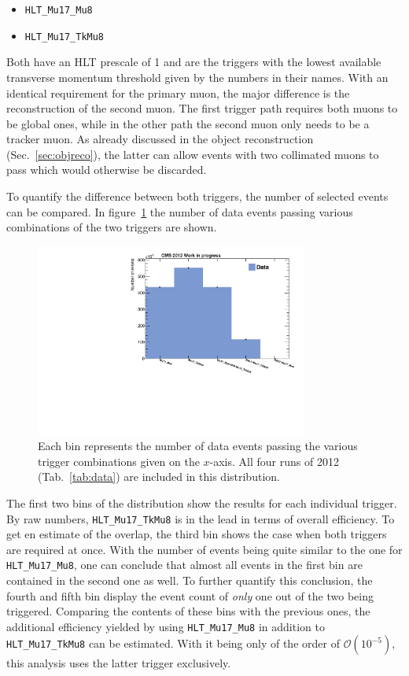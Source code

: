 \begin{itemize}
\item \verb+HLT_Mu17_Mu8+
\item \verb+HLT_Mu17_TkMu8+
\end{itemize}

Both have an HLT prescale of 1 and are the triggers with the lowest available transverse momentum threshold given by the numbers in their names. With an identical requirement for the primary muon, the major difference is the reconstruction of the second muon. The first trigger path requires both muons to be global ones, while in the other path the second muon only needs to be a tracker muon. As already discussed in the object reconstruction (Sec.~\ref{sec:objreco}), the latter can allow events with two collimated muons to pass which would otherwise be discarded.

To quantify the difference between both triggers, the number of selected events can be compared. In figure~\ref{fig:matched} the number of data events passing various combinations of the two triggers are shown.

\begin{figure}[ht!]
  \centering
    \includegraphics[width=0.8\textwidth]{plots/dycut_matched.pdf}
  \caption{Each bin represents the number of data events passing the various trigger combinations given on the $x$-axis. All four runs of 2012 (Tab.~\ref{tab:data}) are included in this distribution.}
  \label{fig:matched}
\end{figure}

\noindent The first two bins of the distribution show the results for each individual trigger. By raw numbers, \verb+HLT_Mu17_TkMu8+ is in the lead in terms of overall efficiency. To get en estimate of the overlap, the third bin shows the case when both triggers are required at once. With the number of events being quite similar to the one for \verb+HLT_Mu17_Mu8+, one can conclude that almost all events in the first bin are contained in the second one as well. To further quantify this conclusion, the fourth and fifth bin display the event count of \textit{only} one out of the two being triggered. Comparing the contents of these bins with the previous ones, the additional efficiency yielded by using \verb+HLT_Mu17_Mu8+ in addition to \verb+HLT_Mu17_TkMu8+ can be estimated. With it being only of the order of $\mathcal{O}(10^{-5})$, this analysis uses the latter trigger exclusively.

